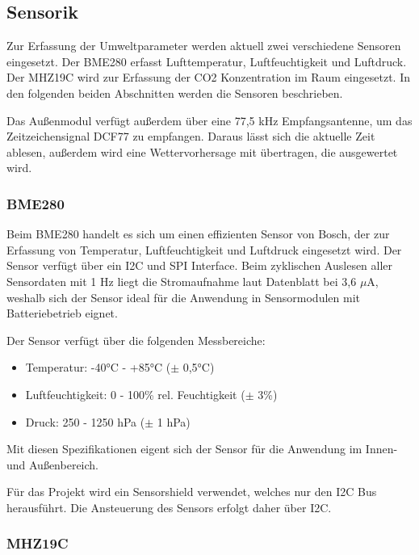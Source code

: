 \documentclass[a4paper,11pt]{article}
\begin{document}
\subsection{Sensorik}
\label{subsub:sensorik}

Zur Erfassung der Umweltparameter werden aktuell zwei verschiedene Sensoren eingesetzt. Der BME280 erfasst Lufttemperatur, Luftfeuchtigkeit und Luftdruck. 
Der MHZ19C wird zur Erfassung der CO2 Konzentration im Raum eingesetzt. In den folgenden beiden Abschnitten werden die Sensoren beschrieben. 

\vspace{0.2cm}
\noindent
Das Außenmodul verfügt außerdem über eine 77,5 kHz Empfangsantenne, um das Zeitzeichensignal DCF77 zu empfangen. Daraus lässt sich die aktuelle Zeit ablesen,
außerdem wird eine Wettervorhersage mit übertragen, die ausgewertet wird. 

\subsubsection{BME280}
\label{subsubsub:bme280}

Beim BME280 handelt es sich um einen effizienten Sensor von Bosch, der zur Erfassung von Temperatur, Luftfeuchtigkeit und Luftdruck eingesetzt wird. 
Der Sensor verfügt über ein I2C und SPI Interface.
Beim zyklischen Auslesen aller Sensordaten mit 1 Hz liegt die Stromaufnahme laut Datenblatt bei 3,6 $\mu$A, weshalb sich der Sensor ideal für die Anwendung in Sensormodulen mit Batteriebetrieb eignet. 

Der Sensor verfügt über die folgenden Messbereiche:
\begin{itemize}
  \item Temperatur: -40°C - +85°C ($\pm$ 0,5°C)
  \item Luftfeuchtigkeit: 0 - 100\% rel. Feuchtigkeit ($\pm$ 3\%)
  \item Druck: 250 - 1250 hPa ($\pm$ 1 hPa)
\end{itemize}

\noindent
Mit diesen Spezifikationen eigent sich der Sensor für die Anwendung im Innen- und Außenbereich. 

\noindent
Für das Projekt wird ein Sensorshield verwendet, welches nur den I2C Bus herausführt. Die Ansteuerung des Sensors erfolgt daher über I2C. 

\subsubsection{MHZ19C}
\label{subsubsub:mhz19c}
\end{document}
